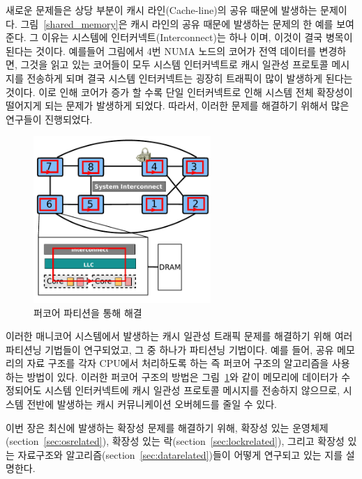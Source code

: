 새로운 문제들은 상당 부분이 캐시 라인(Cache-line)의 공유 때문에 발생하는 문제이다.
그림~\ref{shared_memory}은 캐시 라인의 공유 때문에 발생하는 문제의 한 예를 보여준다. 
그 이유는 시스템에 인터커넥트(Interconnect)는 하나 이며, 이것이 결국 병목이 된다는 것이다. 
예를들어 그림에서 4번 NUMA 노드의 코어가 전역 데이터를 변경하면, 그것을 읽고 있는 코어들이 
모두 시스템 인터커넥트로 캐시 일관성 프로토콜 메시지를 전송하게 되며 결국 시스템 인터커넥트는 
굉장히 트래픽이 많이 발생하게 된다는 것이다.  
이로 인해 코어가 증가 할 수록 단일 인터커넥트로 인해 시스템 전체 
확장성이 떨어지게 되는 문제가 발생하게 되었다.
따라서, 이러한 문제를 해결하기 위해서 많은 연구들이 진행되었다. 

\begin{figure}[h!]
    \centering
    \includegraphics[width=0.6\textwidth]{fig/archcache_percore}
    \caption{퍼코어 파티션을 통해 해결}
  \label{shared_memory2}
\end{figure}

이러한 매니코어 시스템에서 발생하는 
캐시 일관성 트래픽 문제를 해결하기 위해 여러 파티션닝 기법들이 연구되었고, 
그 중 하나가 파티션닝 기법이다. 
예를 들어, 공유 메모리의 자료 구조를 각자 
CPU에서 처리하도록 하는 즉 퍼코어 구조의 알고리즘을 사용하는 방법이 있다.
이러한 퍼코어 구조의 방법은 그림~\ref{shared_memory2}와 같이 메모리에 데이터가 수정되어도 시스템 
인터커넥트에 캐시 일관성 프로토콜 메시지를 전송하지 않으므로, 
시스템 전반에 발생하는 캐시 커뮤니케이션 오버헤드를 줄일 수 있다. 

이번 장은 최신에 발생하는 확장성 문제를 해결하기 위해, 확장성 있는
운영체제(section~\ref{sec:osrelated}), 확장성 있는 락(section~\ref{sec:lockrelated}), 
그리고 확장성 있는 자료구조와 알고리즘(section~\ref{sec:datarelated})들이 어떻게 연구되고 
있는 지를 설명한다.




%



